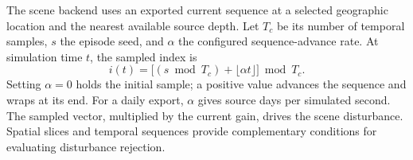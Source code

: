 The scene backend uses an exported current sequence at a selected geographic location and the nearest available source depth. Let $T_c$ be its number of temporal samples, $s$ the episode seed, and $\alpha$ the configured sequence-advance rate. At simulation time $t$, the sampled index is
\begin{equation}
i(t)=\big[(s\bmod T_c)+\lfloor\alpha t\rfloor\big]\bmod T_c.
\end{equation}
Setting $\alpha=0$ holds the initial sample; a positive value advances the sequence and wraps at its end. For a daily export, $\alpha$ gives source days per simulated second. The sampled vector, multiplied by the current gain, drives the scene disturbance. Spatial slices and temporal sequences provide complementary conditions for evaluating disturbance rejection.
